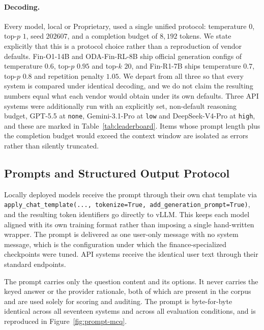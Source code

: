 \paragraph{Decoding.}
Every model, local or Proprietary, used a single unified protocol: temperature $0$, top-$p$ $1$,
seed $202607$, and a completion budget of $8{,}192$ tokens. We state explicitly that this is a
protocol choice rather than a reproduction of vendor defaults. Fin-O1-14B and ODA-Fin-RL-8B ship
official generation configs of temperature $0.6$, top-$p$ $0.95$ and top-$k$ $20$, and Fin-R1-7B
ships temperature $0.7$, top-$p$ $0.8$ and repetition penalty $1.05$. We depart from all three so
that every system is compared under identical decoding, and we do not claim the resulting numbers
equal what each vendor would obtain under its own defaults. Three API systems were additionally
run with an explicitly set, non-default reasoning budget, GPT-5.5 at \texttt{none},
Gemini-3.1-Pro at \texttt{low} and DeepSeek-V4-Pro at \texttt{high}, and these are marked in
Table~\ref{tab:leaderboard}. Items whose prompt length plus the completion budget would exceed
the context window are isolated as errors rather than silently truncated.

\subsection{Prompts and Structured Output Protocol}
\label{app:prompts}

Locally deployed models receive the prompt through their own chat template via
\texttt{apply\_chat\_template(..., tokenize=True, add\_generation\_prompt=True)}, and the
resulting token identifiers go directly to vLLM. This keeps each model aligned with its own
training format rather than imposing a single hand-written wrapper. The prompt is delivered as
one user-only message with no system message, which is the configuration under which the
finance-specialized checkpoints were tuned. API systems receive the identical user text through
their standard endpoints.

The prompt carries only the question content and its options. It never carries the keyed answer
or the provider rationale, both of which are present in the corpus and are used solely for
scoring and auditing. The prompt is byte-for-byte identical across all seventeen systems and
across all evaluation conditions, and is reproduced in Figure~\ref{fig:prompt-mcq}.

